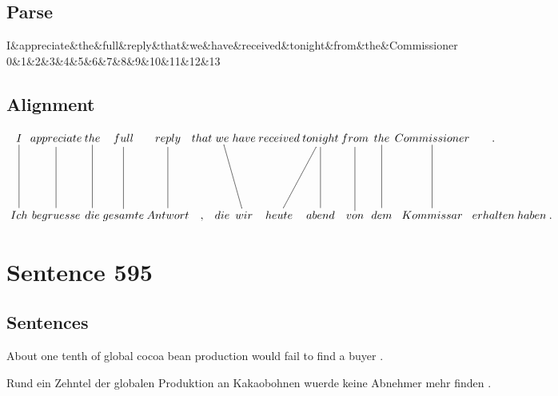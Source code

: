 \documentclass{report}
\begin{document}
\subsection*{Parse}
\begin{dependency}[theme=simple]
\begin{deptext}[column sep=.5cm, row sep=.1ex]
I\&appreciate\&the\&full\&reply\&that\&we\&have\&received\&tonight\&from\&the\&Commissioner\\
0\&1\&2\&3\&4\&5\&6\&7\&8\&9\&10\&11\&12\&13\\
\end{deptext}
\end{dependency}


\subsection*{Alignment}
\scriptsize{
$
\xymatrix@C-2.3pc{
I \ar @{-} [dd] & appreciate \ar @{-} [dd] & the \ar @{-} [dd] & full \ar @{-} [dd] & reply \ar @{-} [dd] & that & we \ar @{-} [ddr] & have & received & tonight \ar @{-} [ddl] \ar @{-} [dd] & from \ar @{-} [dd] & the \ar @{-} [dd] & Commissioner \ar @{-} [dd] & .\\\\
Ich & begruesse & die & gesamte & Antwort & , & die & wir & heute & abend & von & dem & Kommissar & erhalten & haben & .
}$}
\newpage\section*{Sentence 595}

\subsection*{Sentences}
About one tenth of global cocoa bean production would fail to find a buyer .

\noindent Rund ein Zehntel der globalen Produktion an Kakaobohnen wuerde keine Abnehmer mehr finden .
\end{document}
